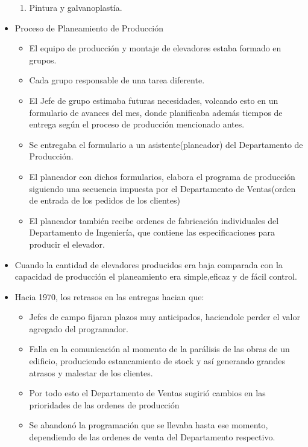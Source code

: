 \begin{itemize}
\begin{enumerate}
		\item Pintura y galvanoplast\'ia.
	\end{enumerate}
	\item Proceso de Planeamiento de Producci\'{o}n
	\begin{itemize}
		\item El equipo de producci\'{o}n y montaje de elevadores estaba formado en grupos.
		\item Cada grupo responsable de una tarea diferente.
		\item El Jefe de grupo estimaba futuras necesidades, volcando esto en un formulario de avances del mes, donde planificaba adem\'{a}s tiempos de entrega seg\'{u}n el proceso de producci\'{o}n mencionado antes.
		\item  Se entregaba el formulario a un asistente(planeador) del Departamento de Producci\'{o}n.
		\item El planeador con dichos formularios, elabora el programa de producci\'{o}n siguiendo una secuencia impuesta por el Departamento de Ventas(orden de entrada de los pedidos de los clientes)
		\item El planeador tambi\'{e}n recibe ordenes de fabricaci\'{o}n individuales del Departamento de Ingenier\'{i}a, que contiene las especificaciones para producir el elevador.
	\end{itemize}
	\item Cuando la cantidad de elevadores producidos era baja comparada con la capacidad de producci\'{o}n el planeamiento era simple,eficaz y de f\'{a}cil control. 
	\item Hacia 1970, los retrasos en las entregas hacian que:
	\begin{itemize}
		\item Jefes de campo fijaran plazos muy anticipados, haciendole perder el valor agregado del programador.
		\item Falla en la comunicaci\'{o}n al momento de la par\'{a}lisis de las obras de un edificio, produciendo estancamiento de stock y as\'{i} generando grandes atrasos y malestar de los clientes.
		\item Por todo esto el Departamento de Ventas sugiri\'{o} cambios en las prioridades de las ordenes de producci\'{o}n
		\item Se abandon\'{o} la programaci\'{o}n que se llevaba hasta ese momento, dependiendo de las ordenes de venta del Departamento respectivo.
	\end{itemize}
\end{itemize}

